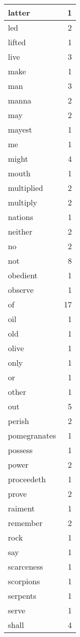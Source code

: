 \begin{center}
\begin{longtable}{l|r}
latter & 1 \\ \hline
led & 2 \\ \hline
lifted & 1 \\ \hline
live & 3 \\ \hline
make & 1 \\ \hline
man & 3 \\ \hline
manna & 2 \\ \hline
may & 2 \\ \hline
mayest & 1 \\ \hline
me & 1 \\ \hline
might & 4 \\ \hline
mouth & 1 \\ \hline
multiplied & 2 \\ \hline
multiply & 2 \\ \hline
nations & 1 \\ \hline
neither & 2 \\ \hline
no & 2 \\ \hline
not & 8 \\ \hline
obedient & 1 \\ \hline
observe & 1 \\ \hline
of & 17 \\ \hline
oil & 1 \\ \hline
old & 1 \\ \hline
olive & 1 \\ \hline
only & 1 \\ \hline
or & 1 \\ \hline
other & 1 \\ \hline
out & 5 \\ \hline
perish & 2 \\ \hline
pomegranates & 1 \\ \hline
possess & 1 \\ \hline
power & 2 \\ \hline
proceedeth & 1 \\ \hline
prove & 2 \\ \hline
raiment & 1 \\ \hline
remember & 2 \\ \hline
rock & 1 \\ \hline
say & 1 \\ \hline
scarceness & 1 \\ \hline
scorpions & 1 \\ \hline
serpents & 1 \\ \hline
serve & 1 \\ \hline
shall & 4 \\ \hline

\end{longtable}
\end{center}
